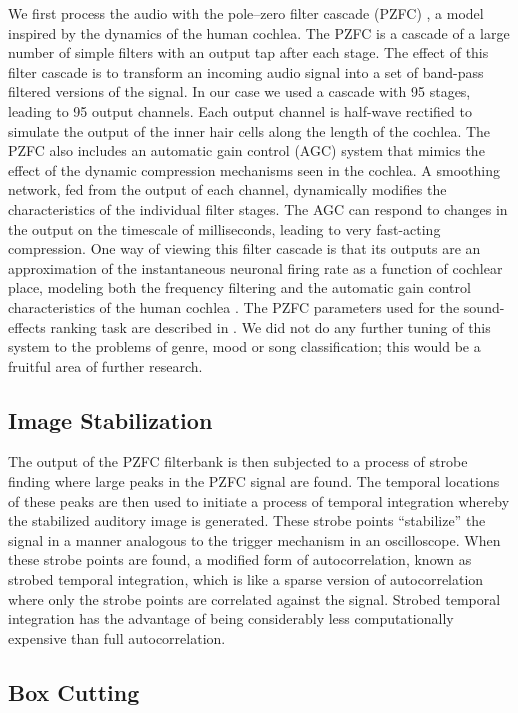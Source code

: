 \documentclass[12pt,oneside]{book}
\begin{document}
We first process the audio with the pole--zero filter cascade (PZFC)
\cite{lyon10}, a model inspired by the dynamics of the human
cochlea. The PZFC is a cascade of a large number of simple filters
with an output tap after each stage. The effect of this filter cascade
is to transform an incoming audio signal into a set of band-pass
filtered versions of the signal. In our case we used a cascade with 95
stages, leading to 95 output channels. Each output channel is
half-wave rectified to simulate the output of the inner hair cells
along the length of the cochlea. The PZFC also includes an automatic
gain control (AGC) system that mimics the effect of the dynamic
compression mechanisms seen in the cochlea. A smoothing network, fed
from the output of each channel, dynamically modifies the
characteristics of the individual filter stages. The AGC can respond
to changes in the output on the timescale of milliseconds, leading to
very fast-acting compression. One way of viewing this filter cascade
is that its outputs are an approximation of the instantaneous neuronal
firing rate as a function of cochlear place, modeling both the
frequency filtering and the automatic gain control characteristics of
the human cochlea \cite{lyon1990}. The PZFC parameters used for the
sound-effects ranking task are described in \cite{lyon10}. We did not
do any further tuning of this system to the problems of genre, mood or
song classification; this would be a fruitful area of further
research.

\subsection{Image Stabilization}

The output of the PZFC filterbank is then subjected to a process of
strobe finding where large peaks in the PZFC signal are found.  The
temporal locations of these peaks are then used to initiate a process
of temporal integration whereby the stabilized auditory image is
generated.  These strobe points ``stabilize'' the signal in a manner
analogous to the trigger mechanism in an oscilloscope.  When these
strobe points are found, a modified form of autocorrelation, known as
strobed temporal integration, which is like a sparse version of
autocorrelation where only the strobe points are correlated against
the signal. Strobed temporal integration has the advantage of being
considerably less computationally expensive than full autocorrelation.

\subsection{Box Cutting}
\end{document}
